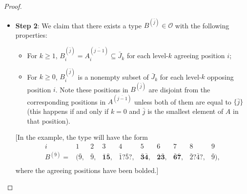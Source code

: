 \documentclass[letterpaper,reqno,11pt]{amsart}
\begin{document}
\begin{proof}
\begin{itemize}
\begin{itemize}
            {\color{gray} [In the example, after removing positions $\{1, 2, 9\}$ from $A$, there are two connected components, and we pick the one with vertices $3, \bar{1}, \bar{5}$, where $\bar{1}$ is connected to $\bar{9}$ via $2, \bar{2}, 1$, so $I_1^= = \{3\}$, $\bar{J}_1 = \{\bar{1}, \bar{5}\}$, and $I_1^{\neq} = \{4\}$.]}
            
            \item \textbf{Step 1.2+}: Remove vertices in $I_1^{=}, I_1^{\neq}, \bar{J}_1$ from the remainder of $A$, and define $I_2^{=}$, $I_2^{\neq}$, $\bar{J}_2$ similar to the previous step. (When choosing a connected component, we may connect it to any vertex in $\bar{J}_0$ or $\bar{J}_1$ through only vertices in $I_0^{\neq}, I_1^{=}, I_1^{\neq}$ and adjacent vertices.) Repeat until all positions in $I$ are labeled.

            {\color{gray} [In the example, we can pick $I_2^{=} = \{5, 6\}, \bar{J}_2 = \{\bar{2}, \bar{3}, \bar{4}\}$, which makes position $8$ level-2 opposing. Finally position $7$ is level-3 agreeing with $\bar{J}_3 = \{\bar{6}, \bar{7}\}$.]}
        \end{itemize}

        Note that $I_0^{\neq}, I_1^{=}, I_1^{\neq}, \dots$ form a partition of $[n]$, while $\bar{J}_0, \bar{J}_1, \dots$ are disjoint but do not necessarily form a partition of $[\bar{j}]$. Let $\bar{J}_{\infty}$ be the elements of $[\bar{j}]$ that are not covered by this process. {\color{gray} [In the example, $\bar{J}_{\infty} = \{\bar{8}\}$.]}

        \item \textbf{Step 2}: We claim that there exists a type $B^{(\bar{j})} \in \mathcal{O}$ with the following properties: \begin{itemize}
            \item For $k\geq 1$, $B^{(\bar{j})}_i = A^{(\overline{j-1})}_i \subseteq \bar{J}_k$ for each level-$k$ agreeing position $i$;
            \item For $k\geq 0$, $B^{(\bar{j})}_i$ is a nonempty subset of $\bar{J}_k$ for each level-$k$ opposing position $i$. Note these positions in $B^{(\bar{j})}$ are disjoint from the corresponding positions in $A^{(\overline{j-1})}$ unless both of them are equal to $\{\bar{j}\}$ (this happens if and only if $k = 0$ and $\bar{j}$ is the smallest element of $A$ in that position).
        \end{itemize}

        {\color{gray} [In the example, the type will have the form 
        \[\begin{array}{cccccccccc}
        i & 1 & 2 & 3 & 4 & 5 & 6 & 7 & 8 & 9 \\
        B^{(\bar{9})} = & (\bar{9}, & \bar{9}, & \mathbf{\bar{1}\bar{5}}, & \bar{1}?\bar{5}?, & \mathbf{\bar{3}\bar{4}}, &\mathbf{\bar{2}\bar{3}}, & \mathbf{\bar{6}\bar{7}}, & \bar{2}?\bar{4}?, & \bar{9}),\\
        \end{array}\]
        where the agreeing positions have been bolded.]}


\end{itemize}
\end{proof}
\end{document}
